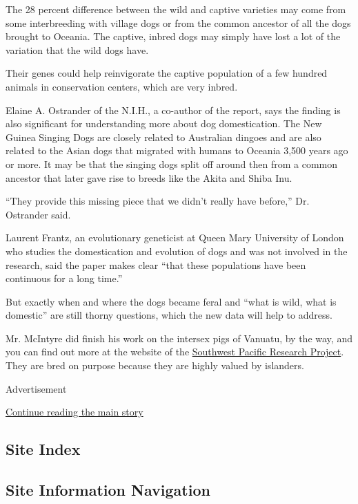 The 28 percent difference between the wild and captive varieties may
come from some interbreeding with village dogs or from the common
ancestor of all the dogs brought to Oceania. The captive, inbred dogs
may simply have lost a lot of the variation that the wild dogs have.

Their genes could help reinvigorate the captive population of a few
hundred animals in conservation centers, which are very inbred.

Elaine A. Ostrander of the N.I.H., a co-author of the report, says the
finding is also significant for understanding more about dog
domestication. The New Guinea Singing Dogs are closely related to
Australian dingoes and are also related to the Asian dogs that migrated
with humans to Oceania 3,500 years ago or more. It may be that the
singing dogs split off around then from a common ancestor that later
gave rise to breeds like the Akita and Shiba Inu.

``They provide this missing piece that we didn't really have before,''
Dr. Ostrander said.

Laurent Frantz, an evolutionary geneticist at Queen Mary University of
London who studies the domestication and evolution of dogs and was not
involved in the research, said the paper makes clear ``that these
populations have been continuous for a long time.''

But exactly when and where the dogs became feral and ``what is wild,
what is domestic'' are still thorny questions, which the new data will
help to address.

Mr. McIntyre did finish his work on the intersex pigs of Vanuatu, by the
way, and you can find out more at the website of the
\href{http://swprp.org}{Southwest Pacific Research Project}. They are
bred on purpose because they are highly valued by islanders.

Advertisement

\protect\hyperlink{after-bottom}{Continue reading the main story}

\hypertarget{site-index}{%
\subsection{Site Index}\label{site-index}}

\hypertarget{site-information-navigation}{%
\subsection{Site Information
Navigation}\label{site-information-navigation}}

